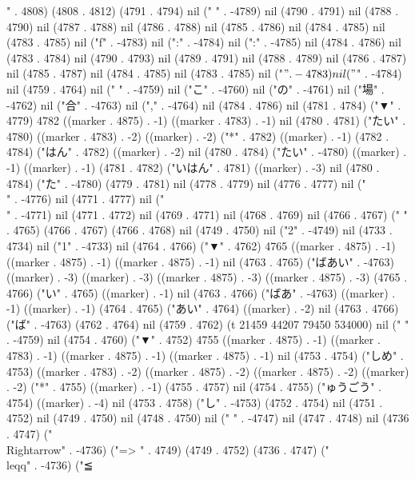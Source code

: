 " . 4808) (4808 . 4812) (4791 . 4794) nil (" " . -4789) nil (4790 . 4791) nil (4788 . 4790) nil (4787 . 4788) nil (4786 . 4788) nil (4785 . 4786) nil (4784 . 4785) nil (4783 . 4785) nil ("f" . -4783) nil (":" . -4784) nil (":" . -4785) nil (4784 . 4786) nil (4783 . 4784) nil (4790 . 4793) nil (4789 . 4791) nil (4788 . 4789) nil (4786 . 4787) nil (4785 . 4787) nil (4784 . 4785) nil (4783 . 4785) nil ("$" . -4783) nil ("$" . -4784) nil (4759 . 4764) nil (" " . -4759) nil ("こ" . -4760) nil ("の" . -4761) nil ("場" . -4762) nil ("合" . -4763) nil ("," . -4764) nil (4784 . 4786) nil (4781 . 4784) ("▼" . 4779) 4782 ((marker . 4875) . -1) ((marker . 4783) . -1) nil (4780 . 4781) ("たい" . 4780) ((marker . 4783) . -2) ((marker) . -2) ("*" . 4782) ((marker) . -1) (4782 . 4784) ("はん" . 4782) ((marker) . -2) nil (4780 . 4784) ("たい" . -4780) ((marker) . -1) ((marker) . -1) (4781 . 4782) ("いはん" . 4781) ((marker) . -3) nil (4780 . 4784) ("た" . -4780) (4779 . 4781) nil (4778 . 4779) nil (4776 . 4777) nil ("\\" . -4776) nil (4771 . 4777) nil ("\\" . -4771) nil (4771 . 4772) nil (4769 . 4771) nil (4768 . 4769) nil (4766 . 4767) (" " . 4765) (4766 . 4767) (4766 . 4768) nil (4749 . 4750) nil ("2" . -4749) nil (4733 . 4734) nil ("1" . -4733) nil (4764 . 4766) ("▼" . 4762) 4765 ((marker . 4875) . -1) ((marker . 4875) . -1) ((marker . 4875) . -1) nil (4763 . 4765) ("ばあい" . -4763) ((marker) . -3) ((marker) . -3) ((marker . 4875) . -3) ((marker . 4875) . -3) (4765 . 4766) ("い" . 4765) ((marker) . -1) nil (4763 . 4766) ("ばあ" . -4763) ((marker) . -1) ((marker) . -1) (4764 . 4765) ("あい" . 4764) ((marker) . -2) nil (4763 . 4766) ("ば" . -4763) (4762 . 4764) nil (4759 . 4762) (t 21459 44207 79450 534000) nil (" " . -4759) nil (4754 . 4760) ("▼" . 4752) 4755 ((marker . 4875) . -1) ((marker . 4783) . -1) ((marker . 4875) . -1) ((marker . 4875) . -1) nil (4753 . 4754) ("しめ" . 4753) ((marker . 4783) . -2) ((marker . 4875) . -2) ((marker . 4875) . -2) ((marker) . -2) ("*" . 4755) ((marker) . -1) (4755 . 4757) nil (4754 . 4755) ("ゅうごう" . 4754) ((marker) . -4) nil (4753 . 4758) ("し" . -4753) (4752 . 4754) nil (4751 . 4752) nil (4749 . 4750) nil (4748 . 4750) nil (" " . -4747) nil (4747 . 4748) nil (4736 . 4747) ("\\Rightarrow" . -4736) ("=>
" . 4749) (4749 . 4752) (4736 . 4747) ("\\leqq" . -4736) ("≦
